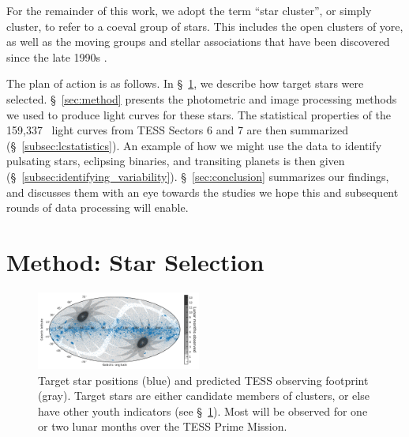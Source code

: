 \documentclass[12pt,twocolumn,tighten]{aastex62}
\newcommand{\numberlcs}{159{,}337\ } %
\begin{document}
For the remainder of this work, we adopt the term ``star cluster'', or
simply cluster, to refer to a coeval group of stars.  This includes
the open clusters of yore, as well as the moving groups and stellar
associations that have been discovered since the late
1990s \citep{zuckerman_young_2004}. 

The plan of action is as follows. In \S~\ref{sec:starselection}, we
describe how target stars were selected. \S~\ref{sec:method} presents
the photometric and image processing methods we used to produce light
curves for these stars.  The statistical properties of the \numberlcs
light curves from TESS Sectors 6 and 7 are then summarized
(\S~\ref{subsec:lcstatistics}).  An example of how we might use the
data to identify pulsating stars, eclipsing binaries, and transiting
planets is then given (\S~\ref{subsec:identifying_variability}).
\S~\ref{sec:conclusion} summarizes our findings, and discusses them
with an eye towards the studies we hope this and subsequent rounds of
data processing will enable.


\section{Method: Star Selection}
\label{sec:starselection}

\begin{figure}[!t]
	\begin{center}
		\leavevmode
		\includegraphics[width=0.48\textwidth]{target_star_positions.png}
	\end{center}
	\vspace{-0.5cm}
	\caption{
    Target star positions (blue) and predicted TESS observing
    footprint (gray).  Target stars are either candidate members of
    clusters, or else have other youth indicators (see
    \S~\ref{sec:starselection}).  Most will be observed for one or two
    lunar months over the TESS Prime Mission.
    \label{fig:cdips_targets_positions}
	}
\end{figure}
\end{document}
